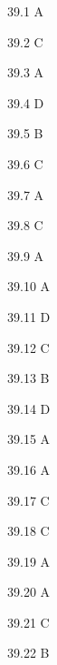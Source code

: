 \begin{Solution}{39.{1}}
A
\end{Solution}
\begin{Solution}{39.{2}}
C
\end{Solution}
\begin{Solution}{39.{3}}
A
\end{Solution}
\begin{Solution}{39.{4}}
D
\end{Solution}
\begin{Solution}{39.{5}}
B
\end{Solution}
\begin{Solution}{39.{6}}
C
\end{Solution}
\begin{Solution}{39.{7}}
A
\end{Solution}
\begin{Solution}{39.{8}}
C
\end{Solution}
\begin{Solution}{39.{9}}
A
\end{Solution}
\begin{Solution}{39.{10}}
A
\end{Solution}
\begin{Solution}{39.{11}}
D
\end{Solution}
\begin{Solution}{39.{12}}
C
\end{Solution}
\begin{Solution}{39.{13}}
B
\end{Solution}
\begin{Solution}{39.{14}}
D
\end{Solution}
\begin{Solution}{39.{15}}
A
\end{Solution}
\begin{Solution}{39.{16}}
A
\end{Solution}
\begin{Solution}{39.{17}}
C
\end{Solution}
\begin{Solution}{39.{18}}
C
\end{Solution}
\begin{Solution}{39.{19}}
A
\end{Solution}
\begin{Solution}{39.{20}}
A
\end{Solution}
\begin{Solution}{39.{21}}
C
\end{Solution}
\begin{Solution}{39.{22}}
B
\end{Solution}
